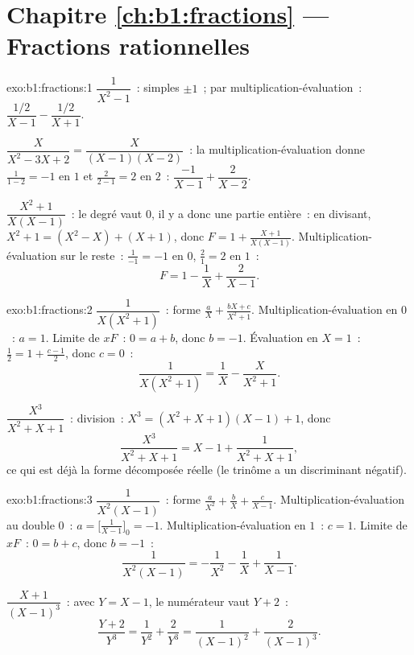 \section*{Chapitre \ref{ch:b1:fractions} --- Fractions rationnelles}

\begin{solution}{exo:b1:fractions:1}
$\dfrac{1}{X^2 - 1}$~:  simples $\pm 1$~; par
multiplication-évaluation~: $\dfrac{1/2}{X-1} - \dfrac{1/2}{X+1}$.

$\dfrac{X}{X^2 - 3X + 2} = \dfrac{X}{(X-1)(X-2)}$~: la
multiplication-évaluation donne $\frac{1}{1-2} = -1$ en $1$ et
$\frac{2}{2-1} = 2$ en $2$~:
$\dfrac{-1}{X-1} + \dfrac{2}{X-2}$.

$\dfrac{X^2+1}{X(X-1)}$~: le degré vaut $0$, il y a donc une partie
entière~: en divisant, $X^2 + 1 = (X^2 - X) + (X + 1)$, donc $F = 1 +
\frac{X+1}{X(X-1)}$. Multiplication-évaluation sur le reste~:
$\frac{1}{-1} = -1$ en $0$, $\frac{2}{1} = 2$ en $1$~:
\[
F = 1 - \frac{1}{X} + \frac{2}{X-1} .
\]
\end{solution}

\begin{solution}{exo:b1:fractions:2}
$\dfrac{1}{X(X^2+1)}$~: forme $\frac aX + \frac{bX + c}{X^2 + 1}$.
Multiplication-évaluation en $0$~: $a = 1$. Limite de $xF$~: $0 = a + b$,
donc $b = -1$. Évaluation en $X = 1$~: $\frac12 = 1 + \frac{c - 1}{2}$,
donc $c = 0$~:
\[
\frac{1}{X(X^2+1)} = \frac 1X - \frac{X}{X^2+1} .
\]

$\dfrac{X^3}{X^2+X+1}$~: division~: $X^3 = (X^2+X+1)(X - 1) + 1$, donc
\[
\frac{X^3}{X^2+X+1} = X - 1 + \frac{1}{X^2 + X + 1} ,
\]
ce qui est déjà la forme décomposée réelle (le trinôme a un
discriminant négatif).
\end{solution}

\begin{solution}{exo:b1:fractions:3}
$\dfrac{1}{X^2(X-1)}$~: forme $\frac{a}{X^2} + \frac bX +
\frac{c}{X-1}$. Multiplication-évaluation au  double $0$~:
$a = \bigl[\frac{1}{X-1}\bigr]_{0} = -1$. Multiplication-évaluation en
$1$~: $c = 1$. Limite de $xF$~: $0 = b + c$, donc $b = -1$~:
\[
\frac{1}{X^2(X-1)} = -\frac{1}{X^2} - \frac1X + \frac{1}{X-1} .
\]

$\dfrac{X+1}{(X-1)^3}$~: avec $Y = X - 1$, le numérateur vaut $Y + 2$~:
\[
\frac{Y + 2}{Y^3} = \frac{1}{Y^2} + \frac{2}{Y^3}
= \frac{1}{(X-1)^2} + \frac{2}{(X-1)^3} .
\]
\end{solution}

